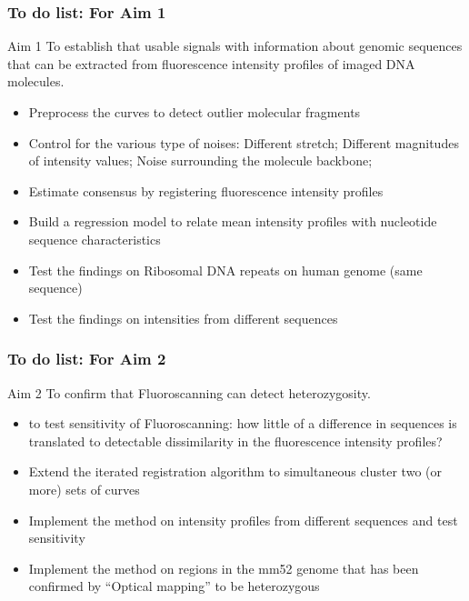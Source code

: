 \documentclass[10pt,dvipsnames,table]{beamer}
\begin{document}
\begin{frame}
\frametitle{To do list: For Aim 1}
\begin{block}{Aim 1}
To establish that usable signals with information about genomic sequences that can be extracted from fluorescence intensity profiles of imaged DNA molecules.
\end{block}
\begin{itemize}
\item[\checkmark] Preprocess the curves to detect outlier molecular fragments
\item[\checkmark] Control for the various type of noises: Different stretch; Different magnitudes of intensity values; Noise surrounding the molecule backbone; 
\item[\checkmark] Estimate consensus by registering fluorescence intensity profiles
\item Build a regression model to relate mean intensity profiles with nucleotide sequence characteristics
\item Test the findings on Ribosomal DNA repeats on human genome (same sequence)
\item Test the findings on intensities from different sequences
\end{itemize}
\end{frame}

\begin{frame}
\frametitle{To do list: For Aim 2}
\begin{block}{Aim 2}
To confirm that Fluoroscanning can detect heterozygosity. 
\begin{itemize}
\footnotesize
\item to test sensitivity of Fluoroscanning: how little of a difference in sequences is translated to detectable dissimilarity in the fluorescence intensity profiles?
\end{itemize}
\end{block}
\begin{itemize}
\item Extend the iterated registration algorithm to simultaneous cluster two (or more) sets of curves
\item Implement the method on intensity profiles from different sequences and test sensitivity
\item Implement the method on regions in the mm52 genome that has been confirmed by ``Optical mapping'' to be heterozygous
\end{itemize}
\end{frame}
\end{document}
